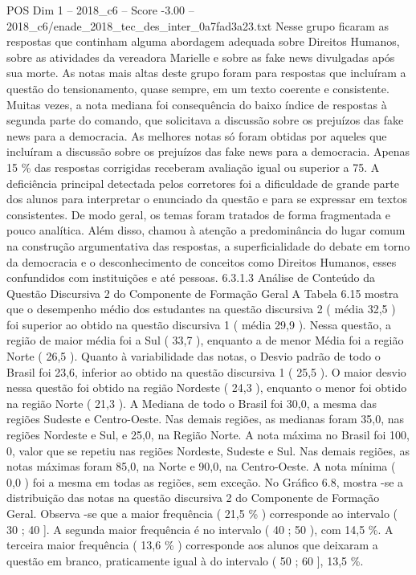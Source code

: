 \begin{textsample}{POS Dim 1 – 2018\_c6 – Score -3.00 – 2018\_c6/enade\_2018\_tec\_des\_inter\_0a7fad3a23.txt}
Nesse grupo ficaram as respostas que continham alguma abordagem adequada sobre Direitos Humanos, sobre as atividades da vereadora Marielle e sobre as fake news divulgadas após sua morte.
As notas mais altas deste grupo foram para respostas que incluíram a questão do tensionamento, quase sempre, em um texto coerente e consistente.
Muitas vezes, a nota mediana foi consequência do baixo índice de respostas à segunda parte do comando, que solicitava a discussão sobre os prejuízos das fake news para a democracia.
As melhores notas só foram obtidas por aqueles que incluíram a discussão sobre os prejuízos das fake news para a democracia.
Apenas 15 \% das respostas corrigidas receberam avaliação igual ou superior a 75.
A deficiência principal detectada pelos corretores foi a dificuldade de grande parte dos alunos para interpretar o enunciado da questão e para se expressar em textos consistentes.
De modo geral, os temas foram tratados de forma fragmentada e pouco analítica.
Além disso, chamou à atenção a predominância do lugar comum na construção argumentativa das respostas, a superficialidade do debate em torno da democracia e o desconhecimento de conceitos como Direitos Humanos, esses confundidos com instituições e até pessoas. 6.3.1.3 Análise de Conteúdo da Questão Discursiva 2 do Componente de Formação Geral A Tabela 6.15 mostra que o desempenho médio dos estudantes na questão discursiva 2 ( média 32,5 ) foi superior ao obtido na questão discursiva 1 ( média 29,9 ).
Nessa questão, a região de maior média foi a Sul ( 33,7 ), enquanto a de menor Média foi a região Norte ( 26,5 ).
Quanto à variabilidade das notas, o Desvio padrão de todo o Brasil foi 23,6, inferior ao obtido na questão discursiva 1 ( 25,5 ).
O maior desvio nessa questão foi obtido na região Nordeste ( 24,3 ), enquanto o menor foi obtido na região Norte ( 21,3 ).
A Mediana de todo o Brasil foi 30,0, a mesma das regiões Sudeste e Centro-Oeste.
Nas demais regiões, as medianas foram 35,0, nas regiões Nordeste e Sul, e 25,0, na Região Norte.
A nota máxima no Brasil foi 100, 0, valor que se repetiu nas regiões Nordeste, Sudeste e Sul.
Nas demais regiões, as notas máximas foram 85,0, na Norte e 90,0, na Centro-Oeste.
A nota mínima ( 0,0 ) foi a mesma em todas as regiões, sem exceção.
No Gráfico 6.8, mostra -se a distribuição das notas na questão discursiva 2 do Componente de Formação Geral.
Observa -se que a maior frequência ( 21,5 \% ) corresponde ao intervalo ( 30 ; 40 ].
A segunda maior frequência é no intervalo ( 40 ; 50 ), com 14,5 \%.
A terceira maior frequência ( 13,6 \% ) corresponde aos alunos que deixaram a questão em branco, praticamente igual à do intervalo ( 50 ; 60 ], 13,5 \%.

\end{textsample}
